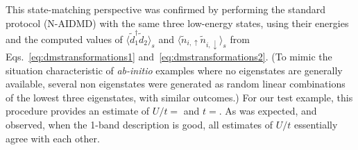 This state-matching perspective was confirmed by performing the standard protocol (N-AIDMD) with the same three low-energy states, 
using their energies and the computed values of $\langle \tilde{d}_1^{\dagger} \tilde{d}_2 \rangle_s$ 
and $\langle \tilde{n}_{i,\uparrow} \tilde{n}_{i,\downarrow} \rangle_{s}$ from Eqs.~\eqref{eq:dmstransformations1} 
and~\eqref{eq:dmstransformations2}. 
(To mimic the situation characteristic of \textit{ab-initio} examples where no eigenstates are generally available, 
several non eigenstates were generated as random linear combinations of the lowest three eigenstates, with 
similar outcomes.) For our test example, this procedure provides an estimate of $U/t = $ and $t = $. 
As was expected, and observed, when the 1-band description is good, all estimates of $U/t$ 
essentially agree with each other. 


